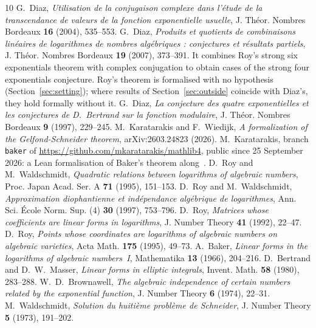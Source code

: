 \documentclass[11pt,a4paper]{article}
\theoremstyle{plain}
\theoremstyle{definition}
\begin{document}
\begin{thebibliography}{10}
 G.~Diaz, \emph{Utilisation de la conjugaison complexe dans l'étude de la
transcendance de valeurs de la fonction exponentielle usuelle}, J. Théor. Nombres Bordeaux
\textbf{16} (2004), 535--553.
 G.~Diaz, \emph{Produits et quotients de combinaisons linéaires de logarithmes
de nombres algébriques : conjectures et résultats partiels}, J. Théor. Nombres Bordeaux
\textbf{19} (2007), 373--391. It combines Roy's strong six exponentials theorem with complex
conjugation to obtain cases of the strong four exponentials conjecture. Roy's theorem is
formalised with no hypothesis (Section~\ref{sec:setting}); where results of
Section~\ref{sec:outside} coincide with Diaz's, they hold formally without it.
 G.~Diaz, \emph{La conjecture des quatre exponentielles et les conjectures de
D.~Bertrand sur la fonction modulaire}, J. Théor. Nombres Bordeaux \textbf{9} (1997), 229--245.
 M.~Karatarakis and F.~Wiedijk, \emph{A formalization of the
Gelfond-Schneider theorem}, arXiv:2603.24823 (2026).
 M.~Karatarakis, branch \texttt{baker} of
\url{https://github.com/mkaratarakis/mathlib4}, public since 25 September 2026: a Lean formalisation
of Baker's theorem along~\cite[Ch.~4]{waldschmidt-book}.
 D.~Roy and M.~Waldschmidt, \emph{Quadratic relations between
logarithms of algebraic numbers}, Proc. Japan Acad. Ser. A \textbf{71} (1995), 151--153.
 D.~Roy and M.~Waldschmidt, \emph{Approximation diophantienne et
indépendance algébrique de logarithmes}, Ann. Sci. École Norm. Sup. (4) \textbf{30} (1997),
753--796.
 D.~Roy, \emph{Matrices whose coefficients are linear forms in logarithms},
J. Number Theory \textbf{41} (1992), 22--47.
 D.~Roy, \emph{Points whose coordinates are logarithms of algebraic numbers on
algebraic varieties}, Acta Math. \textbf{175} (1995), 49--73.
 A.~Baker, \emph{Linear forms in the logarithms of algebraic numbers~I},
Mathematika \textbf{13} (1966), 204--216.
 D.~Bertrand and D.~W.~Masser, \emph{Linear forms in elliptic
integrals}, Invent. Math. \textbf{58} (1980), 283--288.
 W.~D.~Brownawell, \emph{The algebraic independence of certain numbers
related by the exponential function}, J. Number Theory \textbf{6} (1974), 22--31.
 M.~Waldschmidt, \emph{Solution du huitième problème de Schneider},
J. Number Theory \textbf{5} (1973), 191--202.

\end{thebibliography}
\end{document}

